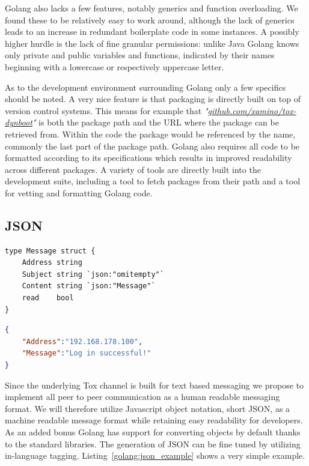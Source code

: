 Golang also lacks a few features, notably generics and function overloading.
We found these to be relatively easy to work around, although the lack of generics leads to an increase in redundant boilerplate code in some instances.
A possibly higher hurdle is the lack of fine granular permissions: unlike Java Golang knows only private and public variables and functions, indicated by their names beginning with a lowercase or respectively uppercase letter.

As to the development environment surrounding Golang only a few specifics should be noted.
A very nice feature is that packaging is directly built on top of version control systems.
This means for example that \textit{"\href{https://github.com/xamino/tox-dynboot}{github.com/xamino/tox-dynboot}"} is both the package path and the URL where the package can be retrieved from.
Within the code the package would be referenced by the name, commonly the last part of the package path.
Golang also requires all code to be formatted according to its specifications which results in improved readability across different packages.
A variety of tools are directly built into the development suite, including a tool to fetch packages from their path and a tool for vetting and formatting Golang code.

\subsection{JSON}
\label{sub:JSON}

\begin{listing}[H]
    \begin{lstlisting}[language=golang,firstnumber=0]
type Message struct {
    Address string
    Subject string `json:"omitempty"`
    Content string `json:"Message"`
    read    bool
}
    \end{lstlisting}
    \begin{lstlisting}[language=json,firstnumber=0]
{
    "Address":"192.168.178.100",
    "Message":"Log in successful!"
}
    \end{lstlisting}
\caption[Golang JSON Example]{
    An example Golang struct with tags and its corresponding JSON representation.
    Note that \textit{"Subject"} is missing from the JSON due to the \textit{"omitempty"} tag and \textit{"read"} due to it being private.
    Also note that \textit{"Content"} has been renamed to \textit{"Message"}.
}
\label{golang:json_example}
\end{listing}

Since the underlying Tox channel is built for text based messaging we propose to implement all peer to peer communication as a human readable messaging format.
We will therefore utilize Javascript object notation, short JSON, as a machine readable message format while retaining easy readability for developers.
As an added bonus Golang has support for converting objects by default thanks to the standard libraries.
The generation of JSON can be fine tuned by utilizing in-language tagging.
Listing~\ref{golang:json_example} shows a very simple example.

